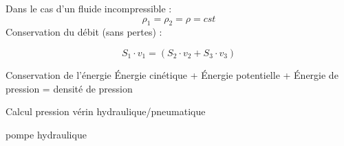 	Dans le cas d'un fluide incompressible : 
	\begin{equation}
	\rho_1=\rho_2=\rho = cst
	\end{equation}
	Conservation du débit (sans pertes) : 
	
	\begin{equation}
	S_1 \cdot v_1=(S_2 \cdot v_2+S_3 \cdot v_3)
	\end{equation}
	
	Conservation de l'énergie
	Énergie cinétique + Énergie potentielle + Énergie de pression = densité de pression
	
	Calcul pression vérin hydraulique/pneumatique
	
	pompe hydraulique
	
	